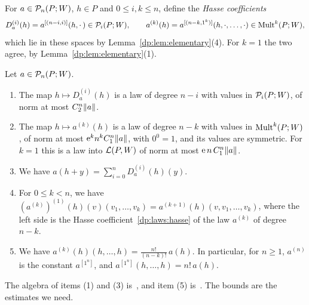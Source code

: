 For $a\in\mathcal P_n(P;W)$, $h\in P$ and $0\le i,k\le n$, define the \emph{Hasse coefficients}
\begin{equation}\label{dp:laws:hasse}
 D^{(i)}_a(h)=a^{[(n-i,i)]}(h,\cdot\,)\in\mathcal P_i(P;W),\qquad a^{(k)}(h)=a^{[(n-k,1^k)]}(h,\cdot,\dots,\cdot)\in\operatorname{Mult}^k(P;W),
\end{equation}
which lie in these spaces by Lemma~\ref{dp:lem:elementary}(4). For $k=1$ the two agree, by Lemma~\ref{dp:lem:elementary}(1).

\begin{lemma}\label{dp:lem:hasse-law}
Let $a\in\mathcal P_n(P;W)$.
\begin{enumerate}
\item The map $h\mapsto D^{(i)}_a(h)$ is a law of degree $n-i$ with values in $\mathcal P_i(P;W)$, of norm at most $C_2^n\lVert a\rVert$.
\item The map $h\mapsto a^{(k)}(h)$ is a law of degree $n-k$ with values in $\operatorname{Mult}^k(P;W)$, of norm at most $\mathrm e^kn^kC_1^n\lVert a\rVert$, with $0^0=1$, and its values are symmetric. For $k=1$ this is a law into $\mathcal L(P,W)$ of norm at most $\mathrm e\,n\,C_1^n\lVert a\rVert$.
\item We have $a(h+y)=\sum_{i=0}^nD^{(i)}_a(h)(y)$.
\item For $0\le k<n$, we have $(a^{(k)})^{(1)}(h)(v)(v_1,\dots,v_k)=a^{(k+1)}(h)(v,v_1,\dots,v_k)$, where the left side is the Hasse coefficient~\eqref{dp:laws:hasse} of the law $a^{(k)}$ of degree $n-k$.
\item We have $a^{(k)}(h)(h,\dots,h)=\frac{n!}{(n-k)!}\,a(h)$. In particular, for $n\ge1$, $a^{(n)}$ is the constant $a^{[1^n]}$, and $a^{[1^n]}(h,\dots,h)=n!\,a(h)$.
\end{enumerate}
\end{lemma}

The algebra of items (1) and (3) is~\cite[Prop.~IV.10; II~\S4]{Ro}, and item (5) is~\cite[Th.~II.1]{Ro}. The bounds are the estimates we need.

